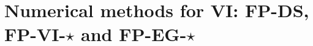 \documentclass[a4paper]{article}
\begin{document}
\makeRR   %



\tableofcontents

\def\figwidth{0.33\textwidth}
\def\legendwidth{0.6\textwidth}
\def\legendheight{0.15\textheight}
\def\subfiglayout{%
  \captionsetup[subfloat]{farskip=-0pt,captionskip=-2pt,font=scriptsize}%
  \setlength{\abovecaptionskip}{0pt}}



\section{Numerical methods for VI: {\sf FP-DS, FP-VI-$\star$} and {\sf FP-EG-$\star$}}
\label{Sec:Comparison,VI,step-length}
\end{document}
